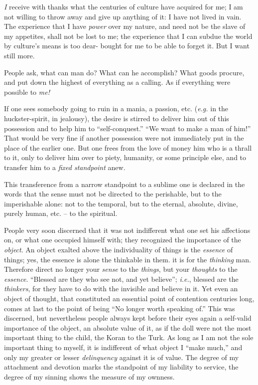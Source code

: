 \textit{I} receive with thanks what the centuries of culture have acquired for 
me; I am not willing to throw away and give up anything of it: I have not 
lived in vain. The experience that I have \textit{power} over my nature, and 
need not be the slave of my appetites, shall not be lost to me; the experience 
that I can subdue the world by culture's means is too dear- bought for me to 
be able to forget it. But I want still more.

People ask, what can man do? What can he accomplish? What goods procure, and 
put down the highest of everything as a calling. As if everything were 
possible to \textit{me!}

If one sees somebody going to ruin in a mania, a passion, etc. (\textit{e.g.} 
in the huckster-spirit, in jealousy), the desire is stirred to deliver him out 
of this possession and to help him to ``self-conquest.'' ``We want to make 
a man of him!'' That would be very fine if another possession were not 
immediately put in the place of the earlier one. But one frees from the love 
of money him who is a thrall to it, only to deliver him over to piety, 
humanity, or some principle else, and to transfer him to a \textit{fixed 
standpoint} anew.

This transference from a narrow standpoint to a sublime one is declared in the 
words that the sense must not be directed to the perishable, but to the 
imperishable alone: not to the temporal, but to the eternal, absolute, divine, 
purely human, etc. -- to the spiritual.

People very soon discerned that it was not indifferent what one set his 
affections on, or what one occupied himself with; they recognized the 
importance of the \textit{object}. An object exalted above the individuality 
of things is the \textit{essence} of things; yes, the essence is alone the 
thinkable in them. it is for the \textit{thinking} man. Therefore direct no 
longer your \textit{sense} to the \textit{things}, but your \textit{thoughts} 
to the \textit{essence}. ``Blessed are they who see not, and yet believe''; 
\textit{i.e.}, blessed are the \textit{thinkers}, for they have to do with 
the invisible and believe in it. Yet even an object of thought, that 
constituted an essential point of contention centuries long, comes at last to 
the point of being ``No longer worth speaking of.'' This was discerned, but 
nevertheless people always kept before their eyes again a self-valid 
importance of the object, an absolute value of it, as if the doll were not the 
most important thing to the child, the Koran to the Turk. As long as I am not 
the sole important thing to myself, it is indifferent of what object I ``make 
much,'' and only my greater or lesser \textit{delinquency} against it is of 
value. The degree of my attachment and devotion marks the standpoint of my 
liability to service, the degree of my sinning shows the measure of my 
ownness.

